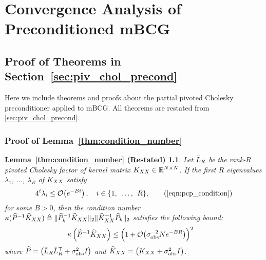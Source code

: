 \chapter{Convergence Analysis of Preconditioned mBCG}

\section{Proof of Theorems in Section~\ref{sec:piv_chol_precond}}
\label{app:proofs}
Here we include theorems and proofs about the partial pivoted Cholesky preconditioner applied to mBCG.
All theorems are restated from \cref{sec:piv_chol_precond}.


\subsection{Proof of Lemma~\ref{thm:condition_number}}
\newtheorem*{thm:condition_number}{Lemma~\ref{thm:condition_number} (Restated)}
\begin{thm:condition_number}
  Let $\bar{L}_{R}$ be the rank-$R$ pivoted Cholesky factor of kernel matrix $K_{XX} \in \mathbb{R}^{N \times N}$.
  If the first $R$ eigenvalues $\lambda_1$, $\ldots$, $\lambda_R$ of $K_{XX}$ satisfy
	\begin{equation*}
		4^{i}\lambda_{i} \leq \bigo{e^{-Bi}}, \quad i \in \{ 1, \:\: \ldots, \:\: R \},
		\tag{\ref{eqn:pcp_condition}}
	\end{equation*}
	for some $B>0$, then the condition number $\kappa(\widehat{P}^{-1}\widehat{K}_{XX}) \triangleq \Vert \widehat{P}_{k}^{-1}\widehat{K}_{XX} \Vert_{2} \Vert \widehat{K}_{XX}^{-1}\widehat{P}_{k} \Vert_{2}$
	satisfies the following bound:
  \begin{align}
    \kappa \left( \trainP^{-1}\trainK \right)
    &\leq \Bigl( 1 + \bigo{\sigma^{-2}_\text{obs} N e^{-BR}} \Bigr)^2
		\nonumber
  \end{align}
	where $\widehat{P} = \left( \bar{L}_R \bar{L}_R^\top + \sigma^2_\text{obs} I \right)$ and $\widehat{K}_{XX} = \left( K_{XX} + \sigma^2_\text{obs} I \right)$.
\end{thm:condition_number}

